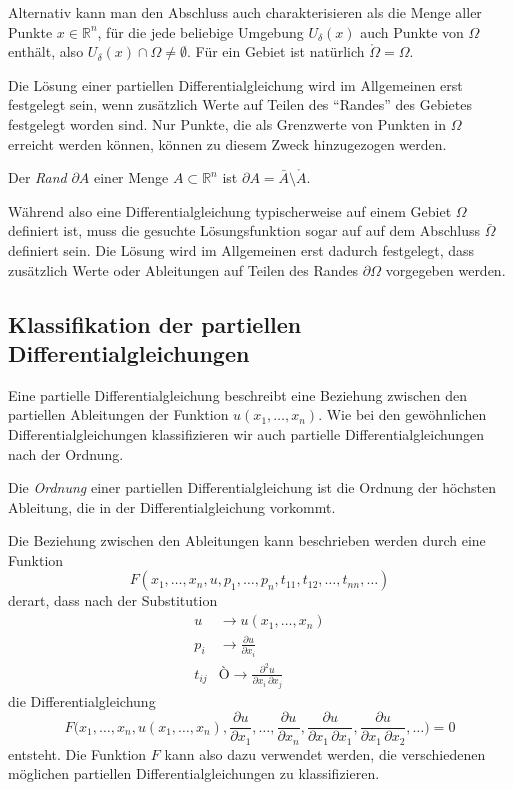 Alternativ kann man den Abschluss auch charakterisieren als die Menge
aller Punkte $x\in\mathbb R^n$, für die jede beliebige Umgebung
$U_\delta(x)$ auch Punkte von $\Omega$ enthält, also
$U_\delta(x)\cap \Omega\ne \emptyset$.
Für ein Gebiet ist natürlich $\mathring\Omega=\Omega$.

Die Lösung einer partiellen Differentialgleichung wird im Allgemeinen erst
festgelegt sein, wenn zusätzlich Werte auf Teilen des ``Randes'' des
Gebietes festgelegt worden sind.
Nur Punkte, die als Grenzwerte von Punkten in $\Omega$ erreicht werden
können, können zu diesem Zweck hinzugezogen werden.

\begin{definition}
Der {\em Rand} $\partial A$ einer Menge $A\subset\mathbb R^n$ ist
$\partial A=\bar{A}\setminus\mathring{A}$.
\end{definition}

Während also eine Differentialgleichung typischerweise auf einem
Gebiet $\Omega$ definiert ist, muss die gesuchte Lösungsfunktion
sogar auf auf dem Abschluss $\bar{\Omega}$ definiert sein.
Die Lösung wird im Allgemeinen erst dadurch festgelegt, dass zusätzlich
Werte oder Ableitungen auf Teilen des Randes $\partial\Omega$ 
vorgegeben werden.

\subsection{Klassifikation der partiellen Differentialgleichungen
\label{subsection:pde:klassifikation}}
Eine partielle Differentialgleichung beschreibt eine Beziehung 
zwischen den partiellen Ableitungen der Funktion $u(x_1,\dots,x_n)$.
Wie bei den gewöhnlichen Differentialgleichungen klassifizieren wir
auch partielle Differentialgleichungen nach der Ordnung.

\begin{definition}
Die {\em Ordnung} einer partiellen Differentialgleichung ist die
Ordnung der höchsten Ableitung, die in der Differentialgleichung
vorkommt.
\end{definition}

Die Beziehung zwischen den Ableitungen kann beschrieben werden durch
eine Funktion
\[
F(x_1,\dots,x_n,u,p_1,\dots,p_n,t_{11},t_{12},\dots,t_{nn},\dots)
\]
derart, dass nach der Substitution
\begin{align*}
u&\to u(x_1,\dots,x_n)
\\
p_i&\to \frac{\partial u}{\partial x_i}
\\
t_{ij} &Ò\to \frac{\partial^2 u}{\partial x_i\,\partial x_j}
\end{align*}
die Differentialgleichung
\[
F\biggl(
x_1,\dots,x_n,u(x_1,\dots,x_n),
\frac{\partial u}{\partial x_1},\dots,\frac{\partial u}{\partial x_n},
\frac{\partial u}{\partial x_1\,\partial x_1},
\frac{\partial u}{\partial x_1\,\partial x_2},\dots
\biggr)
=0
\]
entsteht.
Die Funktion $F$ kann also dazu verwendet werden, die verschiedenen
möglichen partiellen Differentialgleichungen zu klassifizieren.

